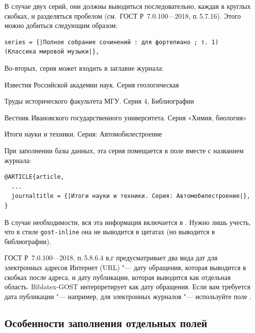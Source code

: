 \documentclass[10pt,a4paper,headings=small,numbers=enddot,english,russian]{ltxdockit}
\newcommand*{\biblatexgost}{Biblatex-GOST\xspace}
\newcommand*{\bibsty}{\texttt}
\newcommand*{\gostbibname}[1][]{ГОСТ#1 Р~7.0.100---2018\xspace}
\newcommand*{\gostbibref}[2][]{\gostbibname[#1], п.\,#2\xspace}
\newenvironment{bibexample}{\begin{list}
     {}
     {\setlength{\leftmargin}{\parindent}%
      \setlength{\itemindent}{-\leftmargin}%
      \setlength{\parsep}{0pt}}}
  {\end{list}}
\begin{document}
\begin{description}
В случае двух серий, они должны выводиться последовательно, каждая в круглых скобках, и
разделяться пробелом (см.~\gostbibref{5.7.16}).
Этого можно добиться следующим образом:

\begin{lstlisting}[style=bibtex,escapechar=|]
series = {|Полное собрание сочинений : для фортепиано ; т. 1) (Классика мировой музыки|},
\end{lstlisting}

Во-вторых, серия может входить в заглавие журнала:

\begin{bibexample}
\item Известия Российской академии наук. Серия геологическая
\item Труды исторического факультета МГУ. Серия 4, Библиографии
\item Вестник Ивановского государственного университета. Серия «Химия, биология»
\item Итоги науки и техники. Серия: Автомобилестроение
\end{bibexample}

При заполнении базы данных, эта серия помещается в поле 
вместе с названием журнала:

\begin{lstlisting}[style=bibtex,escapechar=|]
@ARTICLE{article,
  ...
  journaltitle = {|Итоги науки и техники. Серия: Автомобилестроение|},
}
\end{lstlisting}

\item[Области примечания, стандартного номера и условий доступности.] В случае
необходимости, вся эта информация включается в . Нужно лишь учесть, что
в стиле \bibsty{gost-inline} она не выводится в цитатах (но выводится в
библиографии).

\item[Адреса в сети Интернет.] \gostbibref{5.8.6.4 в,г} предусматривает два вида
  дат для электронных адресов Интернет (URL) "--- дату обращения, которая
  выводится в скобках после адреса, и дату публикации, которая выводится как
  отдельная область.
  \biblatexgost интерпретирует  как дату обращения.
  Если вам требуется дата публикации "--- например, для электронных журналов
  "--- используйте поле .

\end{description}

\subsection{Особенности заполнения отдельных полей}
\label{sec:filling}
\end{document}
